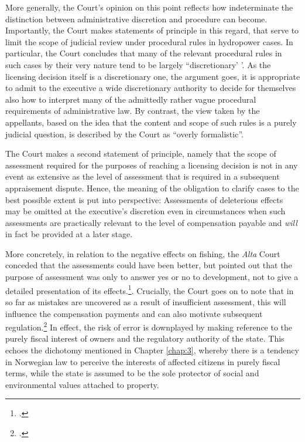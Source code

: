 More generally, the Court's opinion on this point reflects how indeterminate the distinction between administrative discretion and procedure can become. Importantly, the Court makes statements of principle in this regard, that serve to limit the scope of judicial review under procedural rules in hydropower cases. In particular, the Court concludes that many of the relevant procedural rules in such cases by their very nature tend to be largely ``discretionary' '. As the licensing decision itself is a discretionary one, the argument goes, it is appropriate to admit to the executive a wide discretionary authority to decide for themselves also how to interpret many of the admittedly rather vague procedural requirements of administrative law. By contrast, the view taken by the appellants, based on the idea that the content and scope of such rules is a purely judicial question, is described by the Court as ``overly formalistic''.

The Court makes a second statement of principle, namely that the scope of assessment required for the purposes of reaching a licensing decision is not in any event as extensive as the level of assessment that is required in a subsequent appraisement dispute. 
Hence, the meaning of the obligation to clarify cases to the best possible extent is put into perspective: Assessments of deleterious effects may be omitted at the executive's discretion even in circumstances when such assessments are practically relevant to the level of compensation payable and {\it will} in fact be provided at a later stage.

More concretely, in relation to the negative effects on fishing, the {\it Alta} Court conceded that the assessments could have been better, but pointed out that the purpose of assessment was only to answer yes or no to development, not to give a detailed presentation of its effects.\footcite[330]{alta82}. Crucially, the Court goes on to note that in so far as mistakes are uncovered as a result of insufficient assessment, this will influence the compensation payments and can also motivate subsequent regulation.\footcite[330]{alta82} In effect, the risk of error is downplayed by making reference to the purely fiscal interest of owners and the regulatory authority of the state. This echoes the dichotomy mentioned in Chapter \ref{chap:3}, whereby there is a tendency in Norwegian law to perceive the interests of affected citizens in purely fiscal terms, while the state is assumed to be the sole protector of social and environmental values attached to property.

